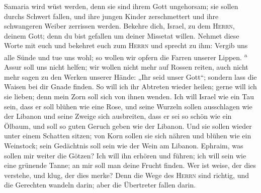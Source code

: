  Samaria wird wüst werden, denn sie sind ihrem Gott
ungehorsam; sie sollen durchs Schwert fallen, und ihre jungen Kinder
zerschmettert und ihre schwangeren Weiber zerrissen werden.
 Bekehre dich, Israel, zu dem \textsc{Herrn}, deinem Gott;
denn du bist gefallen um deiner Missetat willen.  Nehmet
diese Worte mit euch und bekehret euch zum \textsc{Herrn} und sprecht zu
ihm: Vergib uns alle Sünde und tue uns wohl; so wollen wir opfern die
Farren unserer Lippen. \textsuperscript{a}  Assur soll uns
nicht helfen; wir wollen nicht mehr auf Rossen reiten, auch nicht mehr
sagen zu den Werken unserer Hände: „Ihr seid unser Gott``; sondern lass
die Waisen bei dir Gnade finden.  So will ich ihr Abtreten
wieder heilen; gerne will ich sie lieben; denn mein Zorn soll sich von
ihnen wenden.  Ich will Israel wie ein Tau sein, dass er
soll blühen wie eine Rose, und seine Wurzeln sollen ausschlagen wie der
Libanon  und seine Zweige sich ausbreiten, dass er sei so
schön wie ein Ölbaum, und soll so guten Geruch geben wie der Libanon.
 Und sie sollen wieder unter einem Schatten sitzen; von
Korn sollen sie sich nähren und blühen wie ein Weinstock; sein
Gedächtnis soll sein wie der Wein am Libanon.  Ephraim,
was sollen mir weiter die Götzen? Ich will ihn erhören und führen; ich
will sein wie eine grünende Tanne; an mir soll man deine Frucht finden.
 Wer ist weise, der dies verstehe, und klug, der dies
merke? Denn die Wege des \textsc{Herrn} sind richtig, und die Gerechten
wandeln darin; aber die Übertreter fallen darin.
